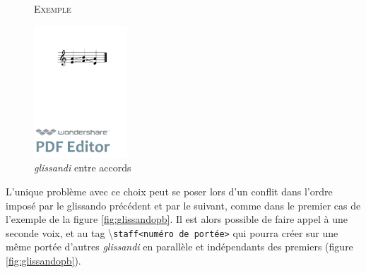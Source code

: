 \documentclass{article}
\newenvironment{gmncode}	{\vspace{-2mm}\small\verbatim}{\endverbatim\vspace{-2mm}}
\newcommand{\code}[1]		{{\small \texttt{#1}}}
\newcommand{\guidotag}[1]	{\textbackslash\code{#1}}
\newcommand{\exemple}		{\vspace{2mm}\hspace*{-3mm}\textsc{Exemple}}
\begin{document}

\begin{figure}[h]
\exemple
\begin{gmncode}
[ \glissando({e,a} {f,b} {a,d}) ]
\end{gmncode}
\begin{center}
\includegraphics[width=35mm]{img/glissandosimple.pdf}
\caption{\emph{glissandi} entre accords}
\label{fig:glissandosimple}
\end{center}
\end{figure}

L'unique problème avec ce choix peut se poser lors d'un conflit dans l'ordre imposé par le glissando précédent et par le suivant, comme dans le premier cas de l'exemple de la figure \ref{fig:glissandopb}. Il est alors possible de faire appel à une seconde voix, et au tag \guidotag{staff\textless{}numéro de portée\textgreater{}} qui pourra créer sur une même portée d'autres \emph{glissandi} en parallèle et indépendants des premiers (figure \ref{fig:glissandopb}).
\\
\end{document}
